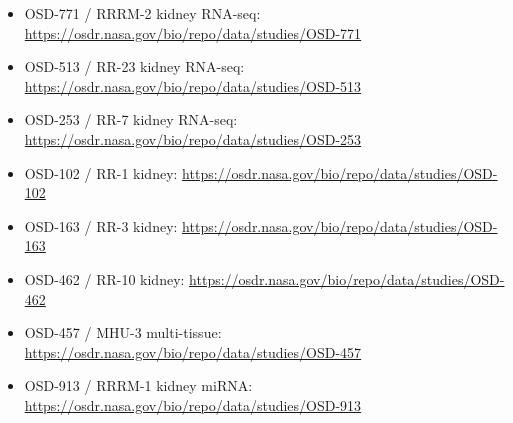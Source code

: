 \documentclass[11pt]{article}
\begin{document}
\begin{itemize}
  \item OSD-771 / RRRM-2 kidney RNA-seq:
  \url{https://osdr.nasa.gov/bio/repo/data/studies/OSD-771}
  \item OSD-513 / RR-23 kidney RNA-seq:
  \url{https://osdr.nasa.gov/bio/repo/data/studies/OSD-513}
  \item OSD-253 / RR-7 kidney RNA-seq:
  \url{https://osdr.nasa.gov/bio/repo/data/studies/OSD-253}
  \item OSD-102 / RR-1 kidney:
  \url{https://osdr.nasa.gov/bio/repo/data/studies/OSD-102}
  \item OSD-163 / RR-3 kidney:
  \url{https://osdr.nasa.gov/bio/repo/data/studies/OSD-163}
  \item OSD-462 / RR-10 kidney:
  \url{https://osdr.nasa.gov/bio/repo/data/studies/OSD-462}
  \item OSD-457 / MHU-3 multi-tissue:
  \url{https://osdr.nasa.gov/bio/repo/data/studies/OSD-457}
  \item OSD-913 / RRRM-1 kidney miRNA:
  \url{https://osdr.nasa.gov/bio/repo/data/studies/OSD-913}
\end{itemize}
\end{document}
